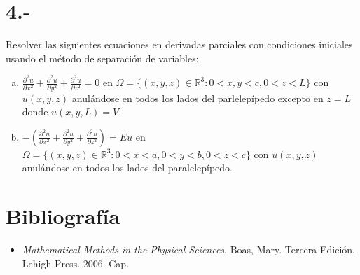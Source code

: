 \documentclass{article}
\begin{document}
\section*{4.-}
Resolver las siguientes ecuaciones en derivadas parciales con 
condiciones iniciales usando el método de separación de variables:
\begin{enumerate}[a)]
    \item $\frac{\partial^2u}{\partial x^2}+\frac{\partial^2u}{\partial y^2}+\frac{\partial^2u}{\partial z^2}=0$ en $\Omega=\{(x,y,z)\in \mathbb{R}^3: 0<x,y<c, 0<z<L\}$ con $u(x,y,z)$ anulándose en todos los lados del parlelepípedo excepto en $z=L$ donde $u(x,y,L)=V$.
    \item $-\left(\frac{\partial^2u}{\partial x^2}+\frac{\partial^2u}{\partial y^2}+\frac{\partial^2u}{\partial z^2}\right)=Eu$ en $\Omega=\{(x,y,z)\in\mathbb{R}^3: 0<x<a,0<y<b, 0<z<c\}$
    con $u(x,y,z)$ anulándose en todos los lados del paralelepípedo. 
\end{enumerate}
\begin{tcolorbox}
    
\end{tcolorbox}
\section*{Bibliografía}
\begin{itemize}
    \item \textit{Mathematical Methods in the Physical Sciences}. Boas, Mary. Tercera Edición. Lehigh Press. 2006. Cap.
\end{itemize}
\end{document}
